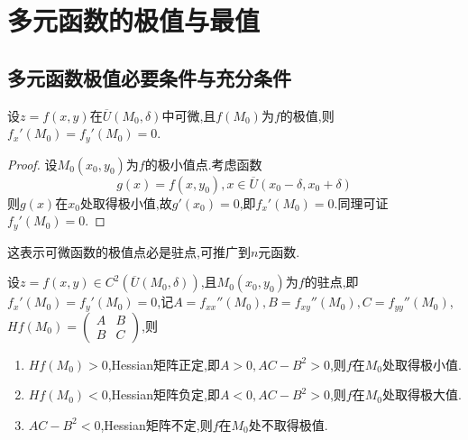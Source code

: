 \setcounter{chapter}{13} %
\chapter{多元函数的极值与最值}

\section{多元函数极值必要条件与充分条件}

\begin{theorem}
    [可微函数有极值的必要条件]

    设$z=f(x,y)$在$\overline U (M_0,\delta)$中可微,且$f(M_0)$为$f$的极值,则$f_x'(M_0) = f_y'(M_0) = 0$.
\end{theorem}

\begin{proof}
    设$M_0(x_0,y_0)$为$f$的极小值点.考虑函数
    $$
    g(x) = f(x,y_0), x \in \overline U {(x_0-\delta,x_0+\delta)}
    $$
    则$g(x)$在$x_0$处取得极小值,故$g'(x_0) = 0$,即$f_x'(M_0) = 0$.同理可证$f_y'(M_0) = 0$.
\end{proof}

这表示可微函数的极值点必是驻点,可推广到$n$元函数.

\begin{theorem}
    [二阶连续可微函数有极值的充分条件]

    设$z=f(x,y) \in C^2( \overline U (M_0,\delta))$,且$M_0(x_0,y_0)$为$f$的驻点,即$f_x'(M_0) = f_y'(M_0) = 0$,记$A = f_{xx}''(M_0),B = f_{xy}''(M_0),C = f_{yy}''(M_0)$,$Hf(M_0) = \begin{pmatrix}
        A & B\\
        B & C
    \end{pmatrix}$,则
    \begin{enumerate}
        \item $Hf(M_0) > 0$,Hessian矩阵正定,即$A > 0,AC - B^2 > 0$,则$f$在$M_0$处取得极小值.
        \item $Hf(M_0) < 0$,Hessian矩阵负定,即$A < 0,AC - B^2 > 0$,则$f$在$M_0$处取得极大值.
        \item $AC - B^2 < 0$,Hessian矩阵不定,则$f$在$M_0$处不取得极值.
    \end{enumerate}
\end{theorem}


